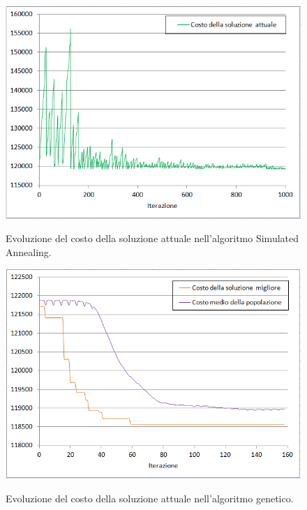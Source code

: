 \begin{figure}[h] 
\begin{center} 
  \includegraphics[scale=0.7]{Images/cost_sa}\\ 
  \caption{\footnotesize{Evoluzione del costo della soluzione attuale nell'algoritmo Simulated Annealing.}}
  \label{cost_sa} 
\end{center} 
\end{figure}
\begin{figure}[h]
\begin{center} 
  \includegraphics[scale=0.7]{Images/cost_genetic}\\ 
  \caption{\footnotesize{Evoluzione del costo della soluzione attuale nell'algoritmo genetico.}}
  \label{cost_genetic} 
\end{center} 
\end{figure}